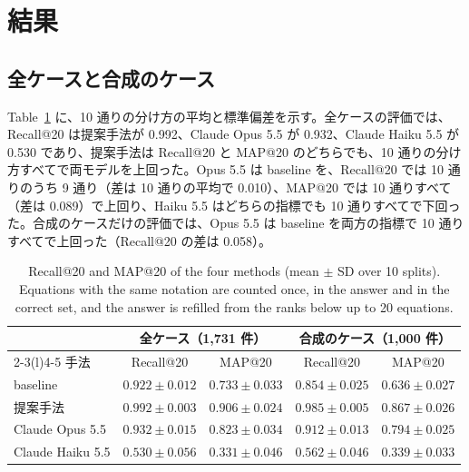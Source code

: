 \documentclass[a4j,dvipdfmx,10pt]{jresume}
\begin{document}
\section{結果}\label{sec:results}
\subsection{全ケースと合成のケース}
Table~\ref{tab:reference} に、10 通りの分け方の平均と標準偏差を示す。全ケースの評価では、Recall@20 は提案手法が 0.992、Claude Opus 5.5 が 0.932、Claude Haiku 5.5 が 0.530 であり、提案手法は Recall@20 と MAP@20 のどちらでも、10 通りの分け方すべてで両モデルを上回った。Opus 5.5 は baseline を、Recall@20 では 10 通りのうち 9 通り（差は 10 通りの平均で 0.010）、MAP@20 では 10 通りすべて（差は 0.089）で上回り、Haiku 5.5 はどちらの指標でも 10 通りすべてで下回った。合成のケースだけの評価では、Opus 5.5 は baseline を両方の指標で 10 通りすべてで上回った（Recall@20 の差は 0.058）。

\begin{table}[t]\centering
\footnotesize
\caption{Recall@20 and MAP@20 of the four methods (mean $\pm$ SD over 10 splits). Equations with the same notation are counted once, in the answer and in the correct set, and the answer is refilled from the ranks below up to 20 equations.}
\label{tab:reference}
\begin{tabular}{@{}lcccc@{}}
\toprule
 & \multicolumn{2}{c}{全ケース（1{,}731 件）} & \multicolumn{2}{c}{合成のケース（1{,}000 件）} \\
\cmidrule(lr){2-3}\cmidrule(l){4-5}
手法 & Recall@20 & MAP@20 & Recall@20 & MAP@20 \\
\midrule
baseline & $0.922 \pm 0.012$ & $0.733 \pm 0.033$ & $0.854 \pm 0.025$ & $0.636 \pm 0.027$ \\
提案手法 & $0.992 \pm 0.003$ & $0.906 \pm 0.024$ & $0.985 \pm 0.005$ & $0.867 \pm 0.026$ \\
Claude Opus 5.5 & $0.932 \pm 0.015$ & $0.823 \pm 0.034$ & $0.912 \pm 0.013$ & $0.794 \pm 0.025$ \\
Claude Haiku 5.5 & $0.530 \pm 0.056$ & $0.331 \pm 0.046$ & $0.562 \pm 0.046$ & $0.339 \pm 0.033$ \\
\bottomrule
\end{tabular}
\end{table}
\end{document}
